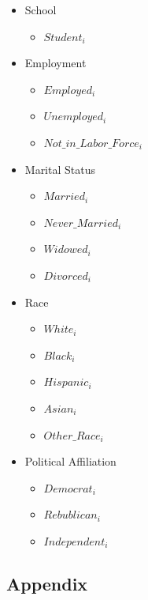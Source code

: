 \documentclass[11pt]{article}
\begin{document}
\begin{itemize}
\begin{itemize}
        \item $Less\_Than\_4\_Year\_College_i$
        \item $4\_Year\_College\_Or\_More_i$
    \end{itemize}
    \item School
    \begin{itemize}
        \item $Student_i$
    \end{itemize}
    \item Employment
    \begin{itemize}
        \item $Employed_i$
        \item $Unemployed_i$
        \item $Not\_in\_Labor\_Force_i$
    \end{itemize}
    \item Marital Status
    \begin{itemize}
        \item $Married_i$
        \item $Never\_Married_i$
        \item $Widowed_i$
        \item $Divorced_i$
    \end{itemize}
    \item Race
    \begin{itemize}
        \item $White_i$
        \item $Black_i$
        \item $Hispanic_i$
        \item $Asian_i$
        \item $Other\_Race_i$
    \end{itemize}
    \item Political Affiliation
    \begin{itemize}
        \item $Democrat_i$
        \item $Rebublican_i$
        \item $Independent_i$
    \end{itemize}
\end{itemize}

\subsection{Appendix}
\end{document}
